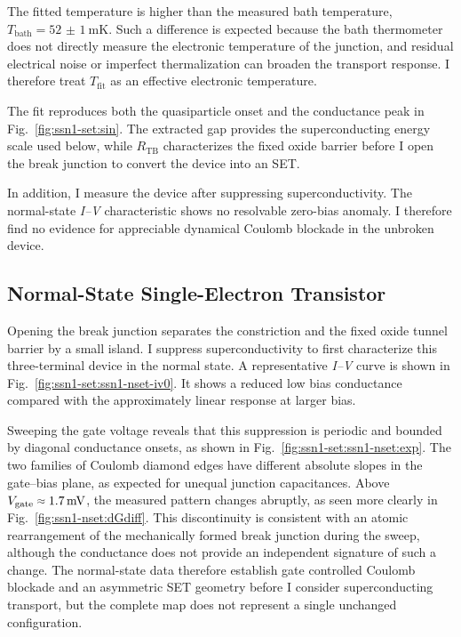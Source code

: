         The fitted temperature is higher than the measured bath temperature, $T_\mathrm{bath}=\qty{52(1)}{\milli\kelvin}$. Such a difference is expected because the bath thermometer does not directly measure the electronic temperature of the junction, and residual electrical noise or imperfect thermalization can broaden the transport response. I therefore treat $T_\mathrm{fit}$ as an effective electronic temperature.

        The fit reproduces both the quasiparticle onset and the conductance peak in Fig.~\ref{fig:ssn1-set:sin}. The extracted gap provides the superconducting energy scale used below, while $R_\mathrm{TB}$ characterizes the fixed oxide barrier before I open the break junction to convert the device into an SET.

        In addition, I measure the device after suppressing superconductivity. The normal-state \textit{I--V} characteristic shows no resolvable zero-bias anomaly. I therefore find no evidence for appreciable dynamical Coulomb blockade in the unbroken device.

        \subsection*{Normal-State Single-Electron Transistor}

            Opening the break junction separates the constriction and the fixed oxide tunnel barrier by a small island. I suppress superconductivity to first characterize this three-terminal device in the normal state. A representative \textit{I--V} curve is shown in Fig.~\ref{fig:ssn1-set:ssn1-nset-iv0}. It shows a reduced low bias conductance compared with the approximately linear response at larger bias.


            Sweeping the gate voltage reveals that this suppression is periodic and bounded by diagonal conductance onsets, as shown in Fig.~\ref{fig:ssn1-set:ssn1-nset:exp}. The two families of Coulomb diamond edges have different absolute slopes in the gate--bias plane, as expected for unequal junction capacitances. Above $V_\mathrm{gate}\sapprox\qty{1.7}{\milli\volt}$, the measured pattern changes abruptly, as seen more clearly in Fig.~\ref{fig:ssn1-nset:dGdiff}. This discontinuity is consistent with an atomic rearrangement of the mechanically formed break junction during the sweep, although the conductance does not provide an independent signature of such a change. The normal-state data therefore establish gate controlled Coulomb blockade and an asymmetric SET geometry before I consider superconducting transport, but the complete map does not represent a single unchanged configuration.

